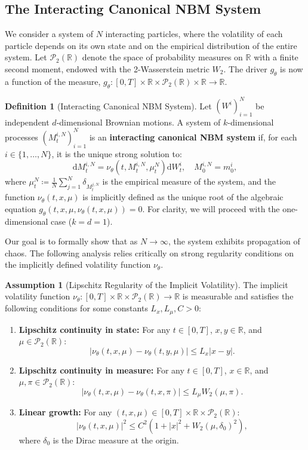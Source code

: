 \documentclass[qian]{imsart}
\newcommand{\R}{\mathbb{R}}
\newcommand{\Pcal}{\mathcal{P}}
\newcommand{\dd}{\mathrm{d}}
\newcommand{\abs}[1]{\left\lvert#1\right\rvert}
\theoremstyle{plain}
\theoremstyle{definition}
\newtheorem{definition}[theorem]{Definition}
\newtheorem{assumption}[theorem]{Assumption}
\begin{document}
\subsection{The Interacting Canonical NBM System}

We consider a system of $N$ interacting particles, where the volatility of each particle depends on its own state and on the empirical distribution of the entire system. Let $\Pcal_2(\R)$ denote the space of probability measures on $\R$ with a finite second moment, endowed with the 2-Wasserstein metric $W_2$. The driver $g_\theta$ is now a function of the measure, $g_\theta: [0,T] \times \R \times \Pcal_2(\R) \times \R \to \R$.

\begin{definition}[Interacting Canonical NBM System]
Let $(W^i)_{i=1}^N$ be independent $d$-dimensional Brownian motions. A system of $k$-dimensional processes $(M^{i,N}_t)_{i=1}^N$ is an \textbf{interacting canonical NBM system} if, for each $i \in \{1, \dots, N\}$, it is the unique strong solution to:
\begin{equation}
\label{eq:interacting_nbm_sde_revised}
    \dd M^{i,N}_t = \nu_\theta(t, M^{i,N}_t, \mu^N_t) \dd W^i_t, \quad M^{i,N}_0 = m^i_0,
\end{equation}
where $\mu^N_t \coloneqq \frac{1}{N}\sum_{j=1}^N \delta_{M^{j,N}_t}$ is the empirical measure of the system, and the function $\nu_\theta(t, x, \mu)$ is implicitly defined as the unique root of the algebraic equation $g_\theta(t, x, \mu, \nu_\theta(t, x, \mu)) = 0$. For clarity, we will proceed with the one-dimensional case ($k=d=1$).
\end{definition}

Our goal is to formally show that as $N \to \infty$, the system exhibits propagation of chaos. The following analysis relies critically on strong regularity conditions on the implicitly defined volatility function $\nu_\theta$.

\begin{assumption}[Lipschitz Regularity of the Implicit Volatility]
\label{ass:mckean_lipschitz_revised}
The implicit volatility function $\nu_\theta: [0,T] \times \R \times \Pcal_2(\R) \to \R$ is measurable and satisfies the following conditions for some constants $L_x, L_\mu, C > 0$:
\begin{enumerate}[label=(\roman*)]
    \item \textbf{Lipschitz continuity in state:} For any $t \in [0,T]$, $x, y \in \R$, and $\mu \in \Pcal_2(\R)$:
    \[ \abs{\nu_\theta(t, x, \mu) - \nu_\theta(t, y, \mu)} \le L_x \abs{x - y}. \]
    \item \textbf{Lipschitz continuity in measure:} For any $t \in [0,T]$, $x \in \R$, and $\mu, \pi \in \Pcal_2(\R)$:
    \[ \abs{\nu_\theta(t, x, \mu) - \nu_\theta(t, x, \pi)} \le L_\mu W_2(\mu, \pi). \]
    \item \textbf{Linear growth:} For any $(t, x, \mu) \in [0,T] \times \R \times \Pcal_2(\R)$:
    \[ \abs{\nu_\theta(t, x, \mu)}^2 \le C^2(1 + \abs{x}^2 + W_2(\mu, \delta_0)^2), \]
    where $\delta_0$ is the Dirac measure at the origin.
\end{enumerate}
\end{assumption}
\end{document}
